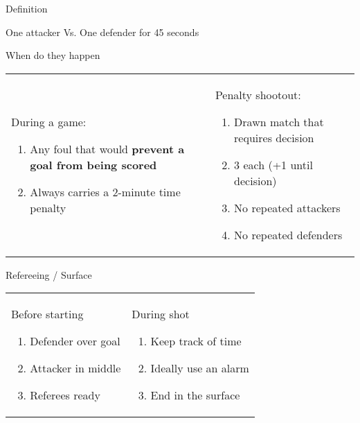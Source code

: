 \begin{frame}{Definition}
    \begin{center}
        One attacker Vs. One defender for 45 seconds
    \end{center}
\end{frame}

\begin{frame}{When do they happen}
    \begin{tabular}{ll}
        \parbox{0.5\textwidth} { During a game:

            \begin{enumerate}
                \item Any foul that would \textbf{prevent a goal from being scored}
                \item Always carries a 2-minute time penalty
            \end{enumerate}
        }
         &
        \parbox{0.5\textwidth} { Penalty shootout:

            \begin{enumerate}
                \item Drawn match that requires decision
                \item 3 each (+1 until decision)
                \item No repeated attackers
                \item No repeated defenders
            \end{enumerate}
        }
    \end{tabular}
\end{frame}

\begin{frame}{Refereeing / Surface}
    \begin{tabular}{ll}
        \parbox{0.5\textwidth} {
            \begin{center}
                Before starting
            \end{center}
            \begin{enumerate}
                \item Defender over goal
                \item Attacker in middle
                \item Referees ready
            \end{enumerate}
        }
         &
        \parbox{0.5\textwidth} {
            \begin{center}
                During shot
            \end{center}
            \begin{enumerate}
                \item Keep track of time
                \item Ideally use an alarm
                \item End in the surface
            \end{enumerate}
        }
    \end{tabular}
\end{frame}

